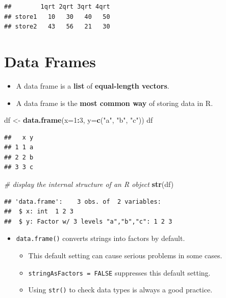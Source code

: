 \documentclass[]{book}
\newenvironment{Shaded}{\begin{snugshade}}{\end{snugshade}}
\newcommand{\CommentTok}[1]{\textcolor[rgb]{0.56,0.35,0.01}{\textit{#1}}}
\newcommand{\DataTypeTok}[1]{\textcolor[rgb]{0.13,0.29,0.53}{#1}}
\newcommand{\DecValTok}[1]{\textcolor[rgb]{0.00,0.00,0.81}{#1}}
\newcommand{\KeywordTok}[1]{\textcolor[rgb]{0.13,0.29,0.53}{\textbf{#1}}}
\newcommand{\NormalTok}[1]{#1}
\newcommand{\OperatorTok}[1]{\textcolor[rgb]{0.81,0.36,0.00}{\textbf{#1}}}
\newcommand{\StringTok}[1]{\textcolor[rgb]{0.31,0.60,0.02}{#1}}
\providecommand{\tightlist}{%
  \setlength{\itemsep}{0pt}\setlength{\parskip}{0pt}}
\begin{document}
\begin{verbatim}
##        1qrt 2qrt 3qrt 4qrt
## store1   10   30   40   50
## store2   43   56   21   30
\end{verbatim}

\hypertarget{data-frames-1}{%
\section{Data Frames}\label{data-frames-1}}

\begin{itemize}
\tightlist
\item
  A data frame is a \textbf{list} of \textbf{equal-length vectors}.
\item
  A data frame is the \textbf{most common way} of storing data in R.
\end{itemize}

\begin{Shaded}
\begin{Highlighting}[]
\NormalTok{df <-}\StringTok{ }\KeywordTok{data.frame}\NormalTok{(}\DataTypeTok{x=}\DecValTok{1}\OperatorTok{:}\DecValTok{3}\NormalTok{, }\DataTypeTok{y=}\KeywordTok{c}\NormalTok{(}\StringTok{"a"}\NormalTok{, }\StringTok{"b"}\NormalTok{, }\StringTok{"c"}\NormalTok{))}
\NormalTok{df}
\end{Highlighting}
\end{Shaded}

\begin{verbatim}
##   x y
## 1 1 a
## 2 2 b
## 3 3 c
\end{verbatim}

\begin{Shaded}
\begin{Highlighting}[]
\CommentTok{# display the internal structure of an R object}
\KeywordTok{str}\NormalTok{(df) }
\end{Highlighting}
\end{Shaded}

\begin{verbatim}
## 'data.frame':    3 obs. of  2 variables:
##  $ x: int  1 2 3
##  $ y: Factor w/ 3 levels "a","b","c": 1 2 3
\end{verbatim}

\begin{itemize}
\tightlist
\item
  \texttt{data.frame()} converts strings into factors by default.

  \begin{itemize}
  \tightlist
  \item
    This default setting can cause serious problems in some cases.
  \item
    \texttt{stringAsFactors\ =\ FALSE} suppresses this default setting.
  \item
    Using \texttt{str()} to check data types is always a good practice.
  \end{itemize}
\end{itemize}
\end{document}
